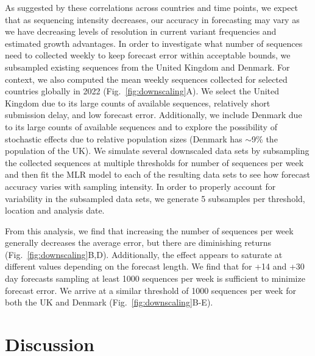 \documentclass[11pt,oneside,letterpaper]{article}
\begin{document}
As suggested by these correlations across countries and time points, we expect that as sequencing intensity decreases, our accuracy in forecasting may vary as we have decreasing levels of resolution in current variant frequencies and estimated growth advantages.
In order to investigate what number of sequences need to collected weekly to keep forecast error within acceptable bounds, we subsampled existing sequences from the United Kingdom and Denmark.
For context, we also computed the mean weekly sequences collected for selected countries globally in 2022 (Fig.~\ref{fig:downscaling}A).
We select the United Kingdom due to its large counts of available sequences, relatively short submission delay, and low forecast error.
Additionally, we include Denmark due to its large counts of available sequences and to explore the possibility of stochastic effects due to relative population sizes (Denmark has $\sim$9\% the population of the UK).
We simulate several downscaled data sets by subsampling the collected sequences at multiple thresholds for number of sequences per week and then fit the MLR model to each of the resulting data sets to see how forecast accuracy varies with sampling intensity.
In order to properly account for variability in the subsampled data sets, we generate 5 subsamples per threshold, location and analysis date.

From this analysis, we find that increasing the number of sequences per week generally decreases the average error, but there are diminishing returns (Fig.~\ref{fig:downscaling}B,D).
Additionally, the effect appears to saturate at different values depending on the forecast length.
We find that for +14 and +30 day forecasts sampling at least 1000 sequences per week is sufficient to minimize forecast error.
We arrive at a similar threshold of 1000 sequences per week for both the UK and Denmark (Fig.~\ref{fig:downscaling}B-E).

\section*{Discussion}

\end{document}
